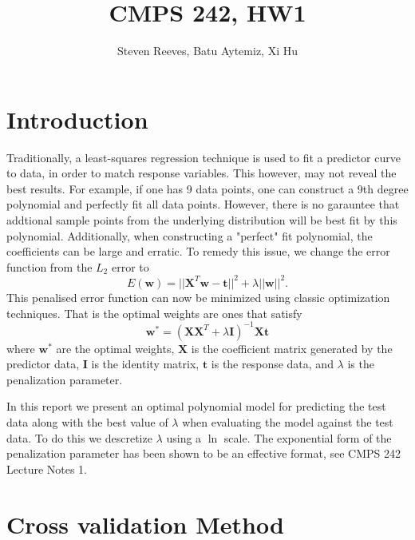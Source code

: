 \documentclass{article}
\title{CMPS 242, HW1}
\author{Steven Reeves, Batu Aytemiz, Xi Hu}
\begin{document}
\maketitle

\section{Introduction}
Traditionally, a least-squares regression technique is used to fit a predictor curve to data, in order to 
match response variables. This however, may not reveal the best results. For example, if one has 9 data points, one can
construct a 9th degree polynomial and perfectly fit all data points. However, there is no garauntee that addtional sample points from
the underlying distribution will be best fit by this polynomial. Additionally, when constructing a "perfect" fit polynomial, 
the coefficients can be large and erratic. To remedy this issue, we change the error function from the $L_2$ error to 
\[E(\mathbf{w}) = ||\mathbf{X}^T\mathbf{w} - \mathbf{t}||^2 + \lambda||\mathbf{w}||^2.\] 
This penalised error function can now be minimized using classic optimization techniques. That is the optimal weights are 
ones that satisfy 
\[\mathbf{w}^* = \left(\mathbf{X}\mathbf{X}^T + \lambda\mathbf{I}\right)^{-1}\mathbf{X}\mathbf{t}\]
where $\mathbf{w}^*$ are the optimal weights, $\mathbf{X}$ is the coefficient matrix generated by the predictor data, 
$\mathbf{I}$ is the identity matrix, $\mathbf{t}$ is the response data, and $\lambda$ is the penalization parameter.

In this report we present an optimal polynomial model for predicting the test data along with the best value of $\lambda$ when evaluating the 
model against the test data. To do this we descretize $\lambda$ using a $\ln$ scale. The exponential form of the penalization parameter has been
shown to be an effective format, see CMPS 242 Lecture Notes 1. 

\section{Cross validation Method}
\end{document}
